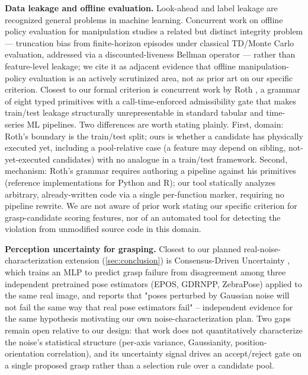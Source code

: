 \documentclass[journal]{IEEEtran}
\begin{document}
\textbf{Data leakage and offline evaluation.} Look-ahead and label
leakage are recognized general problems in machine learning. Concurrent
work on offline policy evaluation for manipulation
\cite{offlinerl_leakage2026} studies a related but distinct integrity
problem --- truncation bias from finite-horizon episodes under classical
TD/Monte Carlo evaluation, addressed via a discounted-liveness Bellman
operator --- rather than feature-level leakage; we cite it as adjacent
evidence that offline manipulation-policy evaluation is an actively
scrutinized area, not as prior art on our specific criterion. Closest to
our formal criterion is concurrent work by Roth \cite{rothgrammar2026}, a grammar of
eight typed primitives with a call-time-enforced admissibility gate that
makes train/test leakage structurally unrepresentable in standard tabular
and time-series ML pipelines. Two differences are worth stating plainly.
First, domain: Roth's boundary is the train/test split; ours is whether a
candidate has physically executed yet, including a pool-relative case
(a feature may depend on sibling, not-yet-executed candidates) with no
analogue in a train/test framework. Second, mechanism: Roth's grammar
requires authoring a pipeline against his primitives (reference
implementations for Python and R); our tool statically analyzes arbitrary,
already-written code via a single per-function marker, requiring no
pipeline rewrite. We are not aware of prior work stating our specific
criterion for grasp-candidate scoring features, nor of an automated tool
for detecting the violation from unmodified source code in this domain.

\textbf{Perception uncertainty for grasping.} Closest to our planned
real-noise-characterization extension (\cref{sec:conclusion}) is
Consensus-Driven Uncertainty \cite{consensusuncertainty2025}, which trains
an MLP to predict grasp failure from disagreement among three independent
pretrained pose estimators (EPOS, GDRNPP, ZebraPose) applied to the same
real image, and reports that "poses perturbed by Gaussian noise will not
fail the same way that real pose estimators fail" -- independent evidence
for the same hypothesis motivating our own noise-characterization plan.
Two gaps remain open relative to our design: that work does not
quantitatively characterize the noise's statistical structure (per-axis
variance, Gaussianity, position-orientation correlation), and its
uncertainty signal drives an accept/reject gate on a single proposed
grasp rather than a selection rule over a candidate pool.
\end{document}
